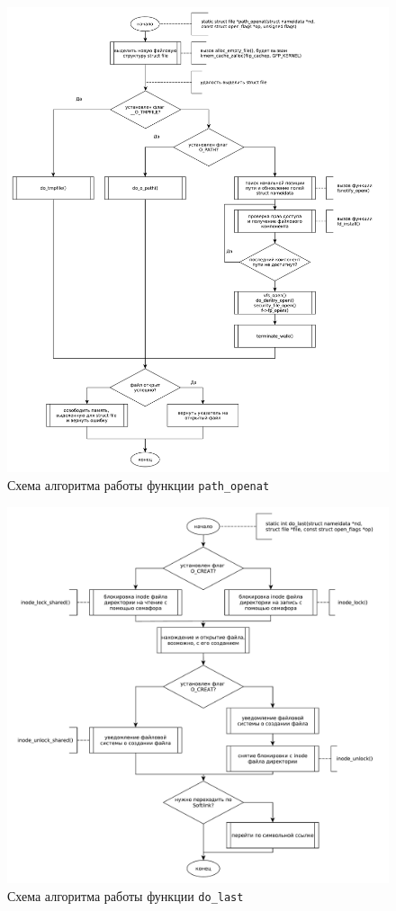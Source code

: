 \clearpage

\begin{figure}[h!btp]
	\centering
	\includegraphics[width=490pt]{inc/path_openat.pdf}
	\caption{Схема алгоритма работы функции \texttt{path\_openat}}
\end{figure}

\clearpage

\begin{figure}[h!btp]
	\centering
	\includegraphics[width=490pt]{inc/do_last.pdf}
	\caption{Схема алгоритма работы функции \texttt{do\_last}}
\end{figure}

